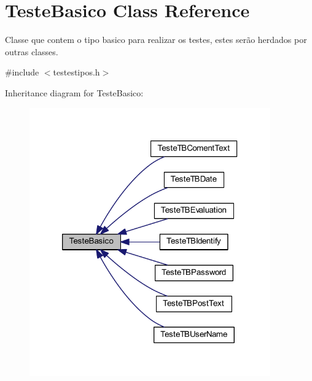 \hypertarget{class_teste_basico}{\section{Teste\-Basico Class Reference}
\label{class_teste_basico}
}


Classe que contem o tipo basico para realizar os testes, estes serão herdados por outras classes.  




{\ttfamily \#include $<$testestipos.\-h$>$}



Inheritance diagram for Teste\-Basico\-:\nopagebreak
\begin{figure}[H]
\begin{center}
\leavevmode
\includegraphics[width=294pt]{class_teste_basico__inherit__graph}
\end{center}
\end{figure}
